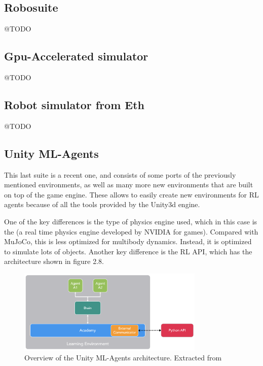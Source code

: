 \subsection{Robosuite}
 
@TODO

\subsection{Gpu-Accelerated simulator}

@TODO

\subsection{Robot simulator from Eth}

@TODO

\subsection{Unity ML-Agents}

This last suite \citep{unity-ml-agents} is a recent one, and consists of some ports of the previously mentioned environments, as well
as many more new environments that are built on top of the \citeauthor{unity} game engine. These allows to easily create new environments
for RL agents because of all the tools provided by the Unity3d engine.

One of the key differences is the type of physics engine used, which in this case is the \citeauthor{physX} (a real time physics engine
developed by NVIDIA for games). Compared with MuJoCo, this is less optimized for multibody dynamics. Instead, it is optimized to simulate
lots of objects. Another key difference is the RL API, which has the architecture shown in figure 2.8.

\begin{figure}[!ht]
    \centering
    \includegraphics[width=3.5in]{./chapters/imgs/img_unity_mlagents_api_overview.png}
    \caption[unity ml agents overview]{Overview of the Unity ML-Agents architecture. Extracted from \citet{unity-ml-agents}}
    \label{fig:unity-ml-agents-overview}
\end{figure}

